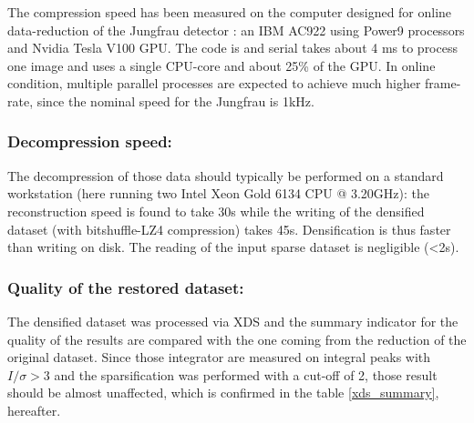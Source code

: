 \documentclass[preprint]{iucr}              %
\begin{document}

The compression speed has been measured on the computer designed for online data-reduction of the Jungfrau detector \cite{sri2021}: 
an IBM AC922 using Power9 processors and Nvidia Tesla V100 GPU. 
The code is and serial takes about 4 ms to process one image and uses a single CPU-core and about 25\% of the GPU. 
In online condition, multiple parallel processes are expected to achieve much higher frame-rate, since the nominal speed for the Jungfrau is 1kHz.

\subsubsection{Decompression speed:} 
The decompression of those data should typically be performed on a standard workstation (here running two Intel Xeon Gold 6134 CPU @ 3.20GHz): the reconstruction speed is found to take 30s while the writing of the densified dataset (with bitshuffle-LZ4 compression) takes 45s. 
Densification is thus faster than writing on disk.
The reading of the input sparse dataset is negligible (<2s).

\subsubsection{Quality of the restored dataset:} 
The densified dataset was processed via XDS and the summary indicator for the quality of the results are compared with the one coming from the reduction of the original dataset. 
Since those integrator are measured on integral peaks with $I/\sigma>3$ and the sparsification was performed
with a cut-off of 2, those result should be almost unaffected, which is confirmed in the table \ref{xds_summary}, hereafter.
\end{document}
